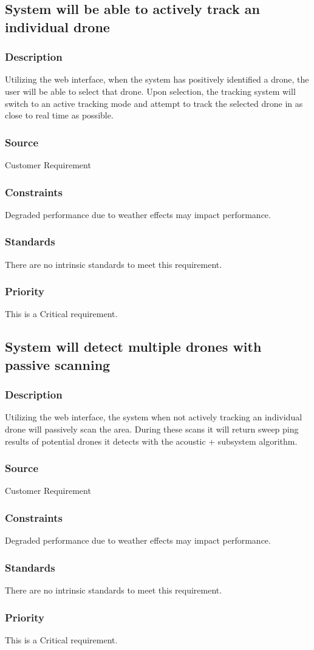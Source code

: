 \subsection{System will be able to actively track an individual drone}
\subsubsection{Description}
Utilizing the web interface, when the system has positively identified a drone, the user will be able to select that drone. Upon selection, the tracking system will switch to an active tracking mode and attempt to track the selected drone in as close to real time as possible.
\subsubsection{Source}
Customer Requirement
\subsubsection{Constraints}
Degraded performance due to weather effects may impact performance.
\subsubsection{Standards}
There are no intrinsic standards to meet this requirement.
\subsubsection{Priority}
This is a Critical requirement.

\subsection{System will detect multiple drones with passive scanning}
\subsubsection{Description}
Utilizing the web interface, the system when not actively tracking an individual drone will passively scan the area. During these scans it will return sweep ping results of potential drones it detects with the acoustic + subsystem algorithm.
\subsubsection{Source}
Customer Requirement
\subsubsection{Constraints}
Degraded performance due to weather effects may impact performance.
\subsubsection{Standards}
There are no intrinsic standards to meet this requirement.
\subsubsection{Priority}
This is a Critical requirement.
